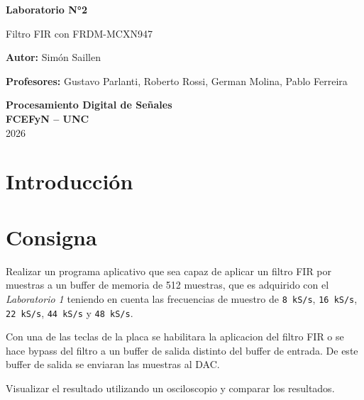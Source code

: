 \documentclass[11pt,a4paper]{article}
\begin{document}
\begin{titlepage}
    \begin{center}
        \vspace*{1cm}

        \Huge
        \textbf{Laboratorio N°2}

        \vspace{0.5cm}
        \LARGE
        Filtro FIR con FRDM-MCXN947

        \vspace{1.5cm}

        \vfill

        \Large
        \textbf{Autor:} Simón Saillen

        \Large
        \textbf{Profesores:} Gustavo Parlanti, Roberto Rossi, German Molina, Pablo Ferreira

        \vspace{0.5cm}

        \Large
        \textbf{Procesamiento Digital de Señales}\\
        \vspace{0.2cm}
        \textbf{FCEFyN -- UNC}\\
        \vspace{0.2cm}
        2026

    \end{center}
\end{titlepage}
\newpage

\section{Introducción}

\section{Consigna}

Realizar un programa aplicativo que sea capaz de aplicar un filtro FIR por
muestras a un buffer de memoria de 512 muestras, que es adquirido con el
\textit{Laboratorio 1} teniendo en cuenta las frecuencias de muestro de
\texttt{8 kS/s}, \texttt{16 kS/s}, \texttt{22 kS/s}, \texttt{44 kS/s} y
\texttt{48 kS/s}.

Con una de las teclas de la placa se habilitara la aplicacion del filtro FIR o
se hace bypass del filtro a un buffer de salida distinto del buffer de entrada.
De este buffer de salida se enviaran las muestras al DAC.\@

Visualizar el resultado utilizando un osciloscopio y comparar los resultados.
\end{document}
